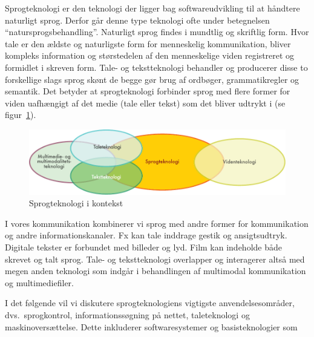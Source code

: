 \begin{multicols}{2}

 Sprogteknologi er den teknologi der ligger bag softwareudvikling til at h\aa ndtere naturligt sprog. Derfor g\aa r denne type teknologi ofte under betegnelsen ``natursprogsbehandling''. Naturligt sprog findes i mundtlig og skriftlig form.  Hvor tale er den \ae ldste og naturligste form for menneskelig kommunikation, bliver kompleks information og st\o rstedelen af den menneskelige viden registreret og formidlet i skreven form.  Tale- og tekstteknologi behandler og producerer disse to forskellige slags sprog sk\o nt de begge g\o r brug af ordb\o ger, grammatikregler og semantik. Det betyder at sprogteknologi forbinder sprog med flere former for viden uafh\ae ngigt af det medie (tale eller tekst) som det bliver udtrykt i  (se figur~\ref{fig:ltincontext_de}).  

\begin{figure}[htb]
  \center
  \includegraphics[width=\textwidth]{../_media/danish/language_technologies}
  \caption{Sprogteknologi i kontekst}
  \label{fig:ltincontext_de}
\end{figure}

I vores kommunikation kombinerer vi sprog med andre former for kommunikation og andre informationskanaler. Fx kan tale inddrage gestik og ansigtsudtryk. Digitale tekster er forbundet med billeder og lyd. Film kan indeholde b\aa de skrevet og talt sprog. Tale- og tekstteknologi overlapper og interagerer \mbox{alts\aa} med megen anden teknologi som indg\aa r i behandlingen af multimodal kommunikation og multimediefiler.

I det f\o lgende vil vi diskutere sprogteknologiens vigtigste anvendelsesomr\aa der, dvs.\ sprogkontrol, informationss\o gning \mbox{p\aa} nettet, taleteknologi og maskinovers\ae ttelse. Dette inkluderer softwaresystemer og basisteknologier som 


\end{multicols}
